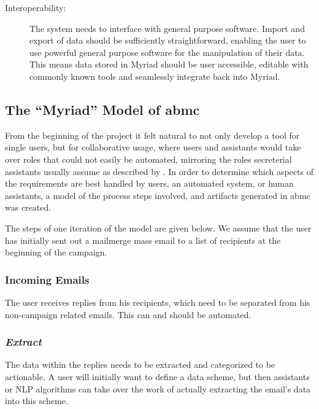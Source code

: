 \begin{description}

\item[Interoperability:] The system needs to interface with general purpose software. Import and export of data should be sufficiently straightforward, enabling the user to use powerful general purpose software for the manipulation of their data. This means data stored in Myriad should be user accessible, editable with commonly known tools and seamlessly integrate back into Myriad.

\end{description}

\subsection{The ``Myriad'' Model of \gls{abmc}}

From the beginning of the project it felt natural to not only develop a tool for single users, but for collaborative usage, where users and assistants would take over roles that could not easily be automated, mirroring the roles secreterial assistants usually assume as described by \citet{Erickson2008a}.
In order to determine which aspects of the requirements are best handled by users, an automated system, or human assistants, a model of the process steps involved, and artifacts generated in \gls{abmc} was created.


The steps of one iteration of the model are given below. We assume that the user has initially sent out a mailmerge mass email to a list of recipients at the beginning of the campaign.

\subsubsection*{Incoming Emails}

The user receives replies from his recipients, which need to be separated from his non-campaign related emails. This can and should be automated.

\subsubsection*{\emph{Extract}}

The data within the replies needs to be extracted and categorized to be actionable. A user will initially want to define a data scheme, but then assistants or NLP algorithms can take over the work of actually extracting the email's data into this scheme.

